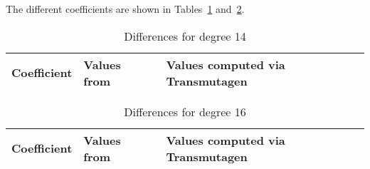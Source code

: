 The different coefficients are shown in Tables~\ref{table:pusa-degree-14}
and~\ref{table:pusa-degree-16}.

\begin{table}[h!]
\centering
\begin{tabular}{ r l l }
Coefficient & Values from~\cite{pusa2012correction} & Values computed via Transmutagen \\
\hline

\end{tabular}
\caption{Differences for degree 14}
\label{table:pusa-degree-14}
\end{table}

\begin{table}[h!]
\centering
\begin{tabular}{ r l l }
Coefficient & Values from~\cite{pusa2012correction} & Values computed via Transmutagen \\
\hline

\end{tabular}
\caption{Differences for degree 16}
\label{table:pusa-degree-16}
\end{table}



